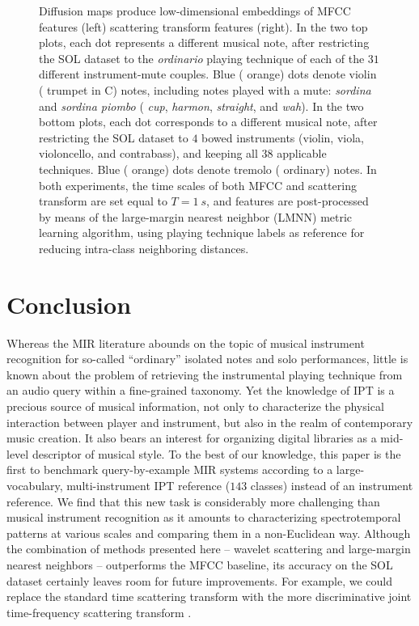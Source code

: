 \begin{figure}
        \caption{Diffusion maps produce low-dimensional embeddings of MFCC features (left) \vs{} scattering transform features (right).
In the two top plots, each dot represents a different musical note, after restricting the SOL dataset to the \emph{ordinario} playing technique of each of the $31$ different instrument-mute couples. Blue (\resp{} orange) dots denote violin (\resp{} trumpet in C) notes, including notes played with a mute: \emph{sordina} and \emph{sordina piombo} (\resp{} \emph{cup}, \emph{harmon}, \emph{straight}, and \emph{wah}).
In the two bottom plots, each dot corresponds to a different musical note, after restricting the SOL dataset to $4$ bowed instruments (violin, viola, violoncello, and contrabass), and keeping all $38$ applicable techniques. Blue (\resp{} orange) dots denote tremolo (\resp{} ordinary) notes.
In both experiments, the time scales of both MFCC and scattering transform are set equal to $T=\SI{1}{s}$, and features are post-processed by means of the large-margin nearest neighbor (LMNN) metric learning algorithm, using playing technique labels as reference for reducing intra-class neighboring distances.}
        \label{fig:embeddings}
\end{figure}



\section{Conclusion}

Whereas the MIR literature abounds on the topic of musical instrument recognition for so-called ``ordinary'' isolated notes and solo performances, little is known about the problem of retrieving the instrumental playing technique from an audio query within a fine-grained taxonomy.
Yet the knowledge of IPT is a precious source of musical information, not only to characterize the physical interaction between player and instrument, but also in the realm of contemporary music creation.
It also bears an interest for organizing digital libraries as a mid-level descriptor of musical style.
To the best of our knowledge, this paper is the first to benchmark query-by-example MIR systems according to a large-vocabulary, multi-instrument IPT reference ($143$ classes) instead of an instrument reference.
We find that this new task is considerably more challenging than musical instrument recognition as it amounts to characterizing spectrotemporal patterns at various scales and comparing them in a non-Euclidean way.
Although the combination of methods presented here -- wavelet scattering and large-margin nearest neighbors -- outperforms the MFCC baseline, its accuracy on the SOL dataset certainly leaves room for future improvements.
For example, we could replace the standard time scattering transform with the more discriminative joint time-frequency scattering transform \cite{anden2018tsp}.

